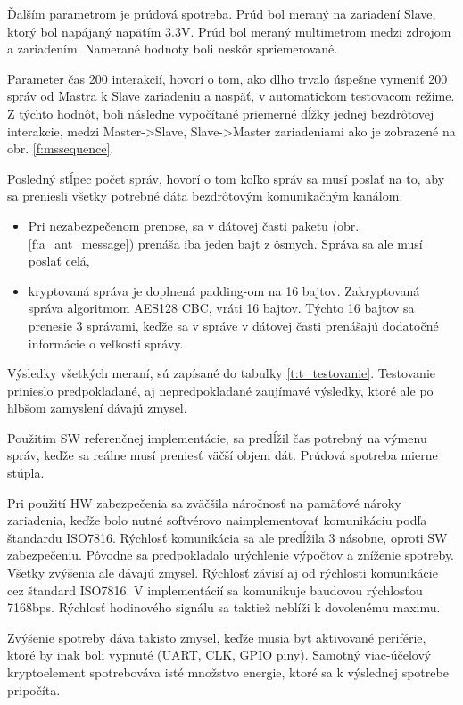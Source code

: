 \documentclass[12pt,a4paper,oneside,openright]{report}
\begin{document}
Ďalším parametrom je prúdová spotreba. Prúd bol meraný na zariadení Slave, ktorý bol napájaný napätím 3.3V. Prúd bol meraný multimetrom medzi zdrojom a zariadením. Namerané hodnoty  boli neskôr spriemerované.

Parameter čas 200 interakcií, hovorí o tom, ako dlho trvalo úspešne vymeniť 200 správ od Mastra k Slave zariadeniu a naspäť, v automatickom testovacom režime. Z týchto hodnôt, boli následne vypočítané priemerné dĺžky jednej bezdrôtovej interakcie, medzi Master-\textgreater Slave, Slave-\textgreater Master zariadeniami ako je zobrazené na obr. \ref{f:mssequence}.

Posledný stĺpec počet správ, hovorí o tom koľko správ sa musí poslať na to, aby sa preniesli všetky potrebné dáta bezdrôtovým komunikačným kanálom. 
\begin{itemize}
	\item Pri nezabezpečenom prenose, sa v dátovej časti paketu (obr. \ref{f:a_ant_message}) prenáša iba jeden bajt z ôsmych. Správa sa ale musí poslať celá,
	\item kryptovaná správa je doplnená padding-om na 16 bajtov. Zakryptovaná správa algoritmom AES128 CBC, vráti 16 bajtov. Týchto 16 bajtov sa prenesie 3 správami, keďže sa v správe v dátovej časti prenášajú dodatočné informácie o veľkosti správy.
\end{itemize}
\onehalfspacing

Výsledky všetkých meraní, sú zapísané do tabuľky \ref{t:t_testovanie}. Testovanie prinieslo predpokladané, aj nepredpokladané zaujímavé výsledky, ktoré ale po hlbšom zamyslení dávajú zmysel.

Použitím SW referenčnej implementácie, sa predĺžil čas potrebný na výmenu správ, keďže sa reálne musí preniesť väčší objem dát. Prúdová spotreba mierne stúpla.

Pri použití HW zabezpečenia sa zväčšila náročnosť na pamäťové nároky zariadenia, keďže bolo nutné softvérovo naimplementovať komunikáciu podľa štandardu ISO7816.
Rýchlosť komunikácia sa ale predĺžila 3 násobne, oproti SW zabezpečeniu. Pôvodne sa predpokladalo urýchlenie výpočtov a zníženie spotreby. Všetky zvýšenia ale dávajú zmysel. Rýchlosť závisí aj od rýchlosti komunikácie cez štandard ISO7816. V implementácií sa komunikuje baudovou rýchlosťou 7168bps. Rýchlosť hodinového signálu sa taktiež neblíži k dovolenému maximu.

Zvýšenie spotreby dáva takisto zmysel, keďže musia byť aktivované periférie, ktoré by inak boli vypnuté (UART, CLK, GPIO piny). Samotný viac-účelový kryptoelement spotrebováva isté množstvo energie, ktoré sa k výslednej spotrebe pripočíta.
\end{document}

